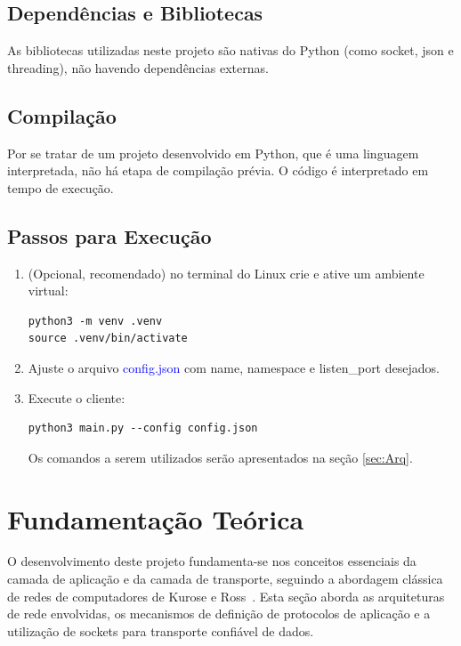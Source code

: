 \documentclass[12pt, a4paper]{article}
\begin{document}
\subsection{Dependências e Bibliotecas}
As bibliotecas utilizadas neste projeto são nativas do Python (como socket, json e threading), não havendo dependências externas.

\subsection{Compilação}
Por se tratar de um projeto desenvolvido em Python, que é uma linguagem interpretada, não há etapa de compilação prévia. O código é interpretado em tempo de execução.


\subsection{Passos para Execução}
\begin{enumerate}
    \item (Opcional, recomendado) no terminal do Linux crie e ative um ambiente virtual:
    \begin{lstlisting}[style=terminal]
python3 -m venv .venv
source .venv/bin/activate 
    \end{lstlisting}
    \item Ajuste o arquivo \textcolor{blue}{config.json} com name, namespace e listen\_port desejados.
    \item Execute o cliente:
    \begin{lstlisting}[style=terminal]
python3 main.py --config config.json
    \end{lstlisting}
    Os comandos a serem utilizados serão apresentados na seção \ref{sec:Arq}.
\end{enumerate}

\section{Fundamentação Teórica}
\label{sec:fundamentacao}
O desenvolvimento deste projeto fundamenta-se nos conceitos essenciais da camada de aplicação e da camada de transporte, seguindo a abordagem clássica de redes de computadores de Kurose e Ross~\cite{kurose}. Esta seção aborda as arquiteturas de rede envolvidas, os mecanismos de definição de protocolos de aplicação e a utilização de sockets para transporte confiável de dados.
\end{document}
